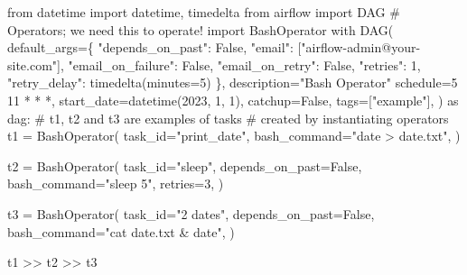 \documentclass[
  12pt,
  letterpaper,
]{krantz}
\newenvironment{Shaded}{\begin{snugshade}}{\end{snugshade}}
\newcommand{\CommentTok}[1]{\textcolor[rgb]{0.37,0.37,0.37}{#1}}
\newcommand{\ControlFlowTok}[1]{\textcolor[rgb]{0.00,0.23,0.31}{#1}}
\newcommand{\DecValTok}[1]{\textcolor[rgb]{0.68,0.00,0.00}{#1}}
\newcommand{\ImportTok}[1]{\textcolor[rgb]{0.00,0.46,0.62}{#1}}
\newcommand{\NormalTok}[1]{\textcolor[rgb]{0.00,0.23,0.31}{#1}}
\newcommand{\OperatorTok}[1]{\textcolor[rgb]{0.37,0.37,0.37}{#1}}
\newcommand{\StringTok}[1]{\textcolor[rgb]{0.13,0.47,0.30}{#1}}
\newcommand{\VariableTok}[1]{\textcolor[rgb]{0.07,0.07,0.07}{#1}}
\begin{document}
\begin{Shaded}
\begin{Highlighting}[]
\ImportTok{from}\NormalTok{ datetime }\ImportTok{import}\NormalTok{ datetime, timedelta}
\ImportTok{from}\NormalTok{ airflow }\ImportTok{import}\NormalTok{ DAG}
\CommentTok{\# Operators; we need this to operate!}
\ImportTok{import}\NormalTok{ BashOperator}
\ControlFlowTok{with}\NormalTok{ DAG(}
\NormalTok{    default\_args}\OperatorTok{=}\NormalTok{\{}
        \StringTok{"depends\_on\_past"}\NormalTok{: }\VariableTok{False}\NormalTok{,}
        \StringTok{"email"}\NormalTok{: [}\StringTok{"airflow{-}admin@your{-}site.com"}\NormalTok{],}
        \StringTok{"email\_on\_failure"}\NormalTok{: }\VariableTok{False}\NormalTok{,}
        \StringTok{"email\_on\_retry"}\NormalTok{: }\VariableTok{False}\NormalTok{,}
        \StringTok{"retries"}\NormalTok{: }\DecValTok{1}\NormalTok{,}
        \StringTok{"retry\_delay"}\NormalTok{: timedelta(minutes}\OperatorTok{=}\DecValTok{5}\NormalTok{)}
\NormalTok{    \},}
\NormalTok{    description}\OperatorTok{=}\StringTok{"Bash Operator"}
\NormalTok{    schedule}\OperatorTok{=}\StringTok{\textquotesingle{}5 11 * * *\textquotesingle{}}\NormalTok{,}
\NormalTok{    start\_date}\OperatorTok{=}\NormalTok{datetime(}\DecValTok{2023}\NormalTok{, }\DecValTok{1}\NormalTok{, }\DecValTok{1}\NormalTok{),}
\NormalTok{    catchup}\OperatorTok{=}\VariableTok{False}\NormalTok{,}
\NormalTok{    tags}\OperatorTok{=}\NormalTok{[}\StringTok{"example"}\NormalTok{],}
\NormalTok{) }\ImportTok{as}\NormalTok{ dag:}
    \CommentTok{\# t1, t2 and t3 are examples of tasks}
    \CommentTok{\# created by instantiating operators}
\NormalTok{    t1 }\OperatorTok{=}\NormalTok{ BashOperator(}
\NormalTok{        task\_id}\OperatorTok{=}\StringTok{"print\_date"}\NormalTok{,}
\NormalTok{        bash\_command}\OperatorTok{=}\StringTok{"date \textgreater{} date.txt"}\NormalTok{,}
\NormalTok{    )}

\NormalTok{    t2 }\OperatorTok{=}\NormalTok{ BashOperator(}
\NormalTok{        task\_id}\OperatorTok{=}\StringTok{"sleep"}\NormalTok{,}
\NormalTok{        depends\_on\_past}\OperatorTok{=}\VariableTok{False}\NormalTok{,}
\NormalTok{        bash\_command}\OperatorTok{=}\StringTok{"sleep 5"}\NormalTok{,}
\NormalTok{        retries}\OperatorTok{=}\DecValTok{3}\NormalTok{,}
\NormalTok{    )}
    
\NormalTok{    t3 }\OperatorTok{=}\NormalTok{ BashOperator(}
\NormalTok{        task\_id}\OperatorTok{=}\StringTok{"2 dates"}\NormalTok{,}
\NormalTok{        depends\_on\_past}\OperatorTok{=}\VariableTok{False}\NormalTok{,}
\NormalTok{        bash\_command}\OperatorTok{=}\StringTok{"cat date.txt \& date"}\NormalTok{,}
\NormalTok{    )}

\NormalTok{    t1 }\OperatorTok{\textgreater{}\textgreater{}}\NormalTok{ t2 }\OperatorTok{\textgreater{}\textgreater{}}\NormalTok{ t3}
\end{Highlighting}
\end{Shaded}
\end{document}
